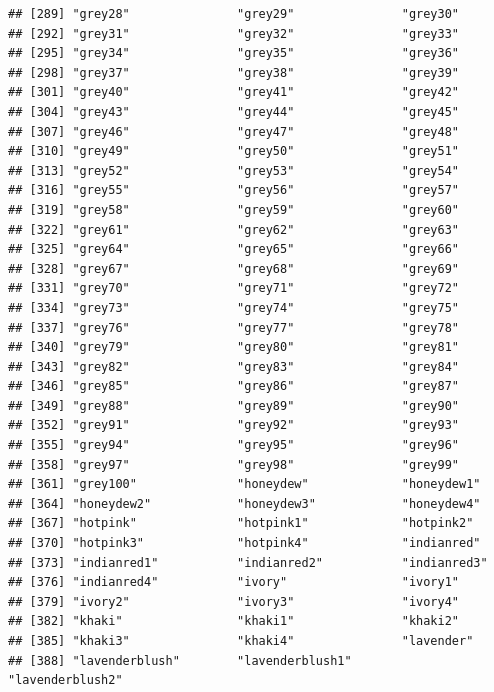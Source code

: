\documentclass[]{book}
\begin{document}
\begin{verbatim}
## [289] "grey28"               "grey29"               "grey30"              
## [292] "grey31"               "grey32"               "grey33"              
## [295] "grey34"               "grey35"               "grey36"              
## [298] "grey37"               "grey38"               "grey39"              
## [301] "grey40"               "grey41"               "grey42"              
## [304] "grey43"               "grey44"               "grey45"              
## [307] "grey46"               "grey47"               "grey48"              
## [310] "grey49"               "grey50"               "grey51"              
## [313] "grey52"               "grey53"               "grey54"              
## [316] "grey55"               "grey56"               "grey57"              
## [319] "grey58"               "grey59"               "grey60"              
## [322] "grey61"               "grey62"               "grey63"              
## [325] "grey64"               "grey65"               "grey66"              
## [328] "grey67"               "grey68"               "grey69"              
## [331] "grey70"               "grey71"               "grey72"              
## [334] "grey73"               "grey74"               "grey75"              
## [337] "grey76"               "grey77"               "grey78"              
## [340] "grey79"               "grey80"               "grey81"              
## [343] "grey82"               "grey83"               "grey84"              
## [346] "grey85"               "grey86"               "grey87"              
## [349] "grey88"               "grey89"               "grey90"              
## [352] "grey91"               "grey92"               "grey93"              
## [355] "grey94"               "grey95"               "grey96"              
## [358] "grey97"               "grey98"               "grey99"              
## [361] "grey100"              "honeydew"             "honeydew1"           
## [364] "honeydew2"            "honeydew3"            "honeydew4"           
## [367] "hotpink"              "hotpink1"             "hotpink2"            
## [370] "hotpink3"             "hotpink4"             "indianred"           
## [373] "indianred1"           "indianred2"           "indianred3"          
## [376] "indianred4"           "ivory"                "ivory1"              
## [379] "ivory2"               "ivory3"               "ivory4"              
## [382] "khaki"                "khaki1"               "khaki2"              
## [385] "khaki3"               "khaki4"               "lavender"            
## [388] "lavenderblush"        "lavenderblush1"       "lavenderblush2"      

\end{verbatim}
\end{document}
